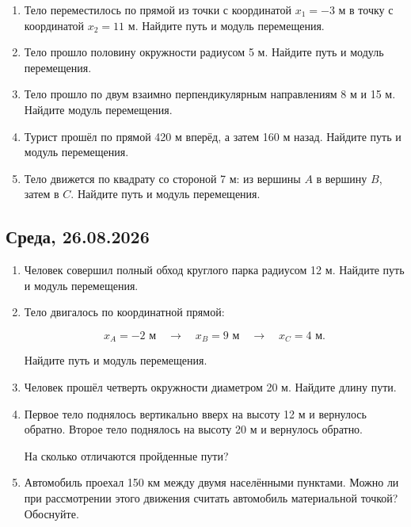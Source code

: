 \documentclass[a4paper,12pt]{article}
\begin{document}
\begin{enumerate}[label=\arabic*.]

\item
Тело переместилось по прямой из точки
с координатой $x_1=-3$ м
в точку с координатой $x_2=11$ м.
Найдите путь и модуль перемещения.

\item
Тело прошло половину окружности радиусом 5 м.
Найдите путь и модуль перемещения.

\item
Тело прошло по двум взаимно перпендикулярным
направлениям 8 м и 15 м.
Найдите модуль перемещения.

\item
Турист прошёл по прямой 420 м вперёд,
а затем 160 м назад.
Найдите путь и модуль перемещения.

\item
Тело движется по квадрату со стороной 7 м:
из вершины $A$ в вершину $B$, затем в $C$.
Найдите путь и модуль перемещения.

\end{enumerate}


\subsection*{\textcolor{darkaccent}{Среда, 26.08.2026}}

\begin{enumerate}[label=\arabic*.]

\item
Человек совершил полный обход круглого парка
радиусом 12 м.
Найдите путь и модуль перемещения.

\item
Тело двигалось по координатной прямой:

\[
x_A=-2\text{ м}
\quad\longrightarrow\quad
x_B=9\text{ м}
\quad\longrightarrow\quad
x_C=4\text{ м}.
\]

Найдите путь и модуль перемещения.

\item
Человек прошёл четверть окружности
диаметром 20 м.
Найдите длину пути.

\item
Первое тело поднялось вертикально вверх
на высоту 12 м и вернулось обратно.
Второе тело поднялось на высоту 20 м
и вернулось обратно.

На сколько отличаются пройденные пути?

\item
Автомобиль проехал 150 км между двумя
населёнными пунктами.
Можно ли при рассмотрении этого движения
считать автомобиль материальной точкой?
Обоснуйте.

\end{enumerate}
\end{document}

